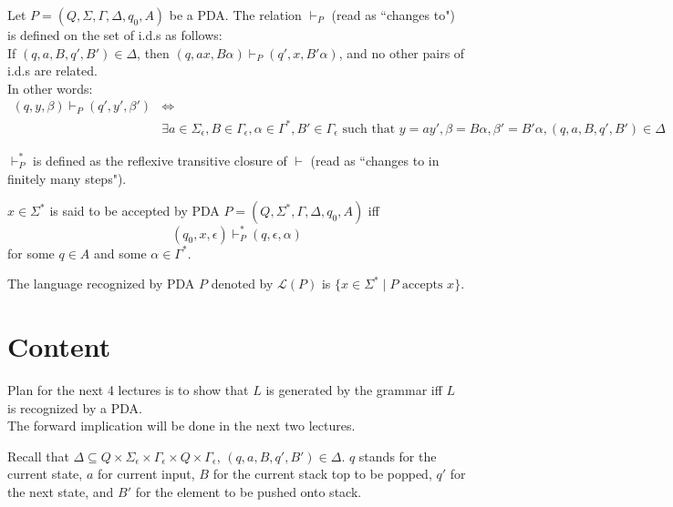 \documentclass[a4paper]{article}
\newcommand{\nl}{\vspace{0.2cm}\\}
\newcommand{\mc}{\mathcal}
\renewcommand{\L}{\mc{L}}
\newcommand{\changesto}{\vdash}
\begin{document}
\begin{defn}
    Let $P = (Q, \Sigma, \Gamma, \Delta, q_0, A)$ be a PDA. The relation $\changesto_P$ (read as ``changes to") is defined on the set of i.d.s as follows:\nl
    If $(q, a, B, q', B') \in \Delta$, then $(q, ax, B\alpha) \changesto_P (q', x, B'\alpha)$, and no other pairs of i.d.s are related.\nl
    In other words:
    \begin{align*}
        (q, y, \beta) \changesto_P (q', y', \beta') &\iff\\ &\exists a \in \Sigma_\epsilon, B \in \Gamma_\epsilon, \alpha \in \Gamma^*, B' \in \Gamma_\epsilon \text{ such that } y = ay', \beta =
    B\alpha, \beta' = B'\alpha, (q, a, B, q', B') \in \Delta
    \end{align*}
\end{defn}

\begin{defn}
    $\changesto^*_P$ is defined as the reflexive transitive closure of $\changesto$ (read as ``changes to in finitely many steps").
\end{defn}

\begin{defn}
    $x \in \Sigma^*$ is said to be accepted by PDA $P = (Q, \Sigma^*, \Gamma, \Delta, q_0, A)$ iff
    $$(q_0, x, \epsilon) \changesto^*_P (q, \epsilon, \alpha)$$
    for some $q \in A$ and some $\alpha \in \Gamma^*$.
\end{defn}


\begin{defn}
    The language recognized by PDA $P$ denoted by $\L(P)$ is $\{x \in \Sigma^* \mid P \text{ accepts }x\}$.
\end{defn}

\section{Content}

Plan for the next 4 lectures is to show that $L$ is generated by the grammar iff $L$ is recognized by a PDA.\nl

The forward implication will be done in the next two lectures.

Recall that $\Delta \subseteq Q \times \Sigma_\epsilon \times \Gamma_\epsilon \times Q \times \Gamma_\epsilon$, $(q, a, B, q', B') \in \Delta$. $q$ stands for the current state, $a$ for current
input, $B$ for the current stack top to be popped, $q'$ for the next state, and $B'$ for the element to be pushed onto stack.\nl
\end{document}

